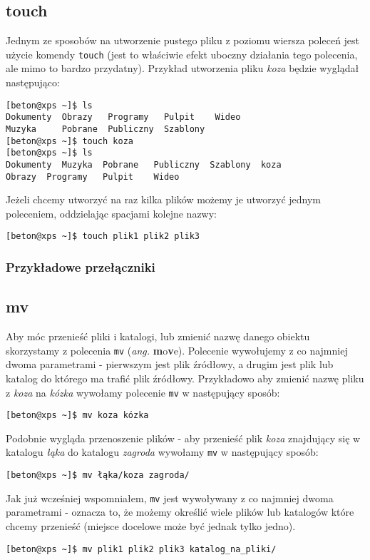 \subsection{touch}
Jednym ze sposobów na utworzenie pustego pliku z poziomu wiersza poleceń jest użycie komendy \texttt{touch} (jest to właściwie efekt uboczny działania tego polecenia, ale mimo to bardzo przydatny). Przykład utworzenia pliku \textit{koza} będzie wyglądał następująco:
\begin{verbatim}
[beton@xps ~]$ ls
Dokumenty  Obrazy   Programy   Pulpit    Wideo
Muzyka     Pobrane  Publiczny  Szablony
[beton@xps ~]$ touch koza
[beton@xps ~]$ ls
Dokumenty  Muzyka  Pobrane   Publiczny  Szablony  koza
Obrazy  Programy   Pulpit    Wideo
\end{verbatim}
Jeżeli chcemy utworzyć na raz kilka plików możemy je utworzyć jednym poleceniem, oddzielając spacjami kolejne nazwy:
\begin{verbatim}
[beton@xps ~]$ touch plik1 plik2 plik3
\end{verbatim}
\subsubsection*{Przykładowe przełączniki}

\subsection{mv}
Aby móc przenieść pliki i katalogi, lub zmienić nazwę danego obiektu skorzystamy z polecenia \texttt{mv} (\textit{ang.} \textbf{m}o\textbf{v}e). Polecenie wywołujemy z co najmniej dwoma parametrami - pierwszym jest plik źródłowy, a drugim jest plik lub katalog do którego ma trafić plik źródłowy. Przykładowo aby zmienić nazwę pliku z \textit{koza} na \textit{kózka} wywołamy polecenie \texttt{mv} w następujący sposób:
\begin{verbatim}
[beton@xps ~]$ mv koza kózka
\end{verbatim}
Podobnie wygląda przenoszenie plików - aby przenieść plik \textit{koza} znajdujący się w katalogu \textit{łąka} do katalogu \textit{zagroda} wywołamy \texttt{mv} w następujący sposób:
\begin{verbatim}
[beton@xps ~]$ mv łąka/koza zagroda/
\end{verbatim}
Jak już wcześniej wspomniałem, \texttt{mv} jest wywoływany z co najmniej dwoma parametrami - oznacza to, że możemy określić wiele plików lub katalogów które chcemy przenieść (miejsce docelowe może być jednak tylko jedno).
\begin{verbatim}
[beton@xps ~]$ mv plik1 plik2 plik3 katalog_na_pliki/
\end{verbatim}

